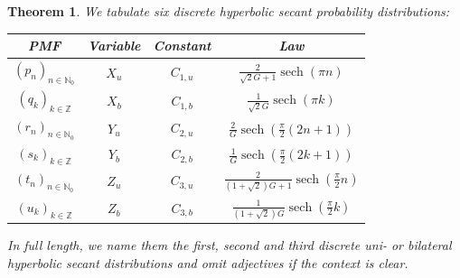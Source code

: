 \documentclass[12pt]{amsart}
\newtheorem{theorem}{Theorem}[section]
\theoremstyle{definition}
\theoremstyle{remark}
\numberwithin{equation}{section}
\newcommand{\1}{\mathbbm{1}}
\begin{document}
\begin{theorem} \label{thm:pmfs}
We tabulate six discrete hyperbolic secant probability distributions:

\renewcommand{\arraystretch}{2}
\begin{table}[h]
    \centering
    \begin{tabular}{c|c|c|c}
PMF  &   Variable & Constant  &  Law \\
\hline
$(p_n)_{n \in \mathbb{N}_0}$ & $X_u$ & $C_{1,u}$ & $\frac{2}{\sqrt{2}G  + 1} \operatorname{sech} \left(\pi n\right)$\\
$(q_k)_{k \in \mathbb{Z}}$ & $X_b$ & $C_{1,b}$ &  $\frac{1}{\sqrt{2}G} \operatorname{sech}\left(\pi k\right)$\\
$(r_n)_{n \in \mathbb{N}_0}$ &  $Y_u$ & $C_{2,u}$ &  $\frac{2}{G} \operatorname{sech} \left(\frac{\pi}{2} (2n+1)\right)$\\
$(s_k)_{k \in \mathbb{Z}}$ &  $Y_b$ & $C_{2,b}$ &  $\frac{1}{G} \operatorname{sech}\left(\frac{\pi}{2} (2k+1)\right)$\\
$(t_n)_{n \in \mathbb{N}_0}$ & $Z_u$ & $C_{3,u}$ &  $\frac{2}{(1+\sqrt{2})G + 1} \operatorname{sech}\left(\frac{\pi}{2} n\right)$\\
$(u_k)_{k \in \mathbb{Z}}$ &  $Z_b$ & $C_{3,b}$ & $\frac{1}{(1+\sqrt{2})G}  \operatorname{sech}\left(\frac{\pi}{2} k\right)$
\end{tabular}
\end{table}

In full length, we name them the first, second and third discrete uni- or bilateral hyperbolic secant distributions and omit adjectives if the context is clear.
\end{theorem}
\end{document}
